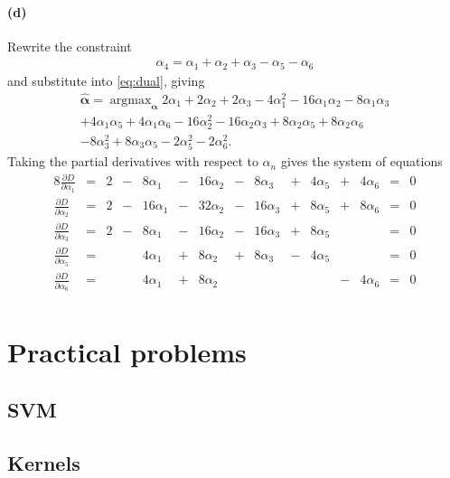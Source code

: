 \documentclass[a4paper,11pt]{article}
\DeclareMathOperator*{\argmax}{argmax}
\begin{document}
\paragraph{(d)}
Rewrite the constraint
\begin{align*}
  \alpha_4=\alpha_1+\alpha_2+\alpha_3-\alpha_5-\alpha_6
\end{align*}
and substitute into \eqref{eq:dual}, giving
\begin{multline}
  \hat{\boldsymbol{\alpha}}=
  \argmax_{\boldsymbol{\alpha}}
    2\alpha_1 + 2\alpha_2 + 2\alpha_3
    -4\alpha_1^2
    -16\alpha_1\alpha_2
    -8\alpha_1\alpha_3\\
    +4\alpha_1\alpha_5
    +4\alpha_1\alpha_6
    -16\alpha_2^2
    -16\alpha_2\alpha_3
    +8\alpha_2\alpha_5
    +8\alpha_2\alpha_6\\
    -8\alpha_3^2
    +8\alpha_3\alpha_5
    -2\alpha_5^2
    -2\alpha_6^2.\label{eq:dual2}
\end{multline}
Taking the partial derivatives with respect to $\alpha_n$ gives the system of equations
\begin{alignat*}{8}
  \frac{\partial D}{\partial \alpha_1} &=&
  2 &-&  8\alpha_1 &-& 16\alpha_2 &-&  8\alpha_3 &+& 4\alpha_5 &+& 4\alpha_6 &=& 0\\
  \frac{\partial D}{\partial \alpha_2} &=&
  2 &-& 16\alpha_1 &-& 32\alpha_2 &-& 16\alpha_3 &+& 8\alpha_5 &+& 8\alpha_6 &=& 0\\
  \frac{\partial D}{\partial \alpha_3} &=&
  2 &-&  8\alpha_1 &-& 16\alpha_2 &-& 16\alpha_3 &+& 8\alpha_5 & &           &=& 0\\
  \frac{\partial D}{\partial \alpha_5} &=&
    & &  4\alpha_1 &+&  8\alpha_2 &+&  8\alpha_3 &-& 4\alpha_5 & &           &=& 0\\
  \frac{\partial D}{\partial \alpha_6} &=&
    & &  4\alpha_1 &+&  8\alpha_2 & &            & &           &-& 4\alpha_6 &=& 0\\
\end{alignat*}
\section{Practical problems}
\subsection{SVM}

\subsection{Kernels}
\end{document}
